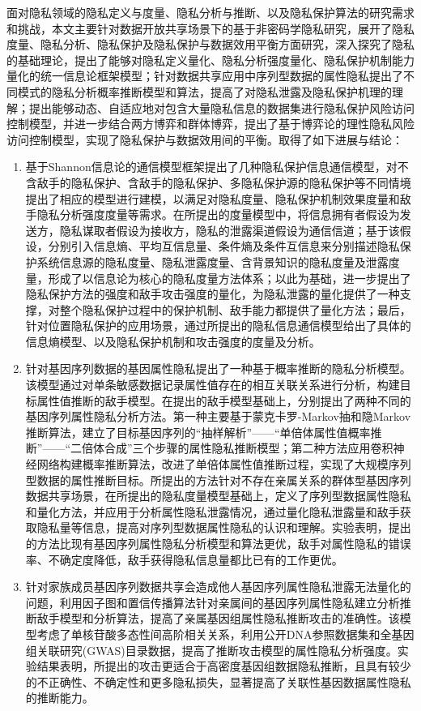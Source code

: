 面对隐私领域的隐私定义与度量、隐私分析与推断、以及隐私保护算法的研究需求和挑战，本文主要针对数据开放共享场景下的基于非密码学隐私研究，展开了隐私度量、隐私分析、隐私保护及隐私保护与数据效用平衡方面研究，深入探究了隐私的基础理论，提出了能够对隐私定义量化、隐私分析强度量化、隐私保护机制能力量化的统一信息论框架模型；针对数据共享应用中序列型数据的属性隐私提出了不同模式的隐私分析概率推断模型和算法，提高了对隐私泄露及隐私保护机理的理解；提出能够动态、自适应地对包含大量隐私信息的数据集进行隐私保护风险访问控制模型，并进一步结合两方博弈和群体博弈，提出了基于博弈论的理性隐私风险访问控制模型，实现了隐私保护与数据效用间的平衡。取得了如下进展与结论：
\begin{enumerate}
	\item 基于Shannon信息论的通信模型框架提出了几种隐私保护信息通信模型，对不含敌手的隐私保护、含敌手的隐私保护、多隐私保护源的隐私保护等不同情境提出了相应的模型进行建模，以满足对隐私度量、隐私保护机制效果度量和敌手隐私分析强度度量等需求。在所提出的度量模型中，将信息拥有者假设为发送方，隐私谋取者假设为接收方，隐私的泄露渠道假设为通信信道；基于该假设，分别引入信息熵、平均互信息量、条件熵及条件互信息来分别描述隐私保护系统信息源的隐私度量、隐私泄露度量、含背景知识的隐私度量及泄露度量，形成了以信息论为核心的隐私度量方法体系；以此为基础，进一步提出了隐私保护方法的强度和敌手攻击强度的量化，为隐私泄露的量化提供了一种支撑，对整个隐私保护过程中的保护机制、敌手能力都提供了量化方法；最后，针对位置隐私保护的应用场景，通过所提出的隐私信息通信模型给出了具体的信息熵模型、以及隐私保护机制和攻击强度的度量及分析。
	\item 针对基因序列数据的基因属性隐私提出了一种基于概率推断的隐私分析模型。该模型通过对单条敏感数据记录属性值存在的相互关联关系进行分析，构建目标属性值推断的敌手模型。在提出的敌手模型基础上，分别提出了两种不同的基因序列属性隐私分析方法。第一种主要基于蒙克卡罗-Markov抽和隐Markov推断算法，建立了目标基因序列的“抽样解析”——“单倍体属性值概率推断”——“二倍体合成”三个步骤的属性隐私推断模型；第二种方法应用卷积神经网络构建概率推断算法，改进了单倍体属性值推断过程，实现了大规模序列型数据的属性推断目标。所提出的方法针对不存在亲属关系的群体型基因序列数据共享场景，在所提出的隐私度量模型基础上，定义了序列型数据属性隐私和量化方法，并应用于分析属性隐私泄露情况，通过量化隐私泄露量和敌手获取隐私量等信息，提高对序列型数据属性隐私的认识和理解。实验表明，提出的方法比现有基因序列属性隐私分析模型和算法更优，敌手对属性隐私的错误率、不确定度降低，敌手获得隐私信息量都比已有的工作更优。
	\item 针对家族成员基因序列数据共享会造成他人基因序列属性隐私泄露无法量化的问题，利用因子图和置信传播算法针对亲属间的基因序列属性隐私建立分析推断敌手模型和分析算法，提高了亲属基因组属性隐私推断攻击的准确性。该模型考虑了单核苷酸多态性间高阶相关关系，利用公开DNA参照数据集和全基因组关联研究(GWAS)目录数据，提高了推断攻击模型的属性隐私分析强度。实验结果表明，所提出的攻击更适合于高密度基因组数据隐私推断，且具有较少的不正确性、不确定性和更多隐私损失，显著提高了关联性基因数据属性隐私的推断能力。

\end{enumerate}
